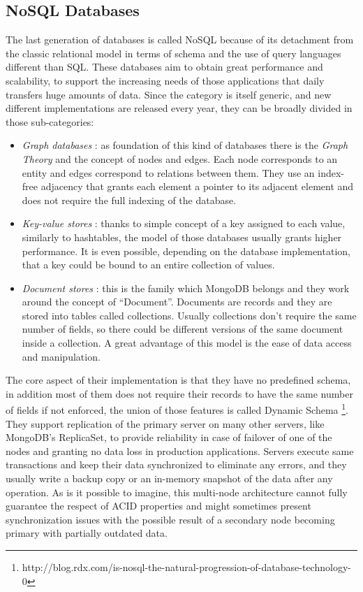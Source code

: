\subsection{NoSQL Databases}
The last generation of databases is called NoSQL because of its detachment from the classic relational model in terms of schema and the use of query languages different  than SQL.
These databases aim to obtain great performance and scalability, to support the increasing needs of those applications that daily transfers huge amounts of data.
Since the category is itself generic, and new different implementations are released every year, they can be broadly divided in those sub-categories:
\begin{itemize}
	\item \textit{Graph databases} : as foundation of this kind of databases there is the \textit{Graph Theory} and the concept of nodes and edges. Each node corresponds to an entity and edges correspond to relations between them. They use an index-free adjacency that grants each element a pointer to its adjacent element and does not require the full indexing of the database.
	\item \textit{Key-value stores} : thanks to simple concept of a key assigned to each value, similarly to hashtables, the model of those databases usually grants higher performance. It is even possible, depending on the database implementation, that a key could be bound to an entire collection of values.
	\item \textit{Document stores} : this is the family which MongoDB belongs and they work around the concept of  “Document”. Documents are records and they are stored into tables called collections. Usually collections don’t require the same number of fields, so there could be different versions of the same document inside a collection. A great advantage of this model is the ease of data access and manipulation.
\end{itemize}
The core aspect of their implementation is that they have no predefined schema, in addition most of them does not require their records to have the same number of fields if not enforced,  the union of those features is called Dynamic Schema \footnote{http://blog.rdx.com/is-nosql-the-natural-progression-of-database-technology-0}.
They support replication of the primary server on many other servers, like MongoDB’s ReplicaSet, to provide reliability in case of failover of one of the nodes and granting no data loss in production applications. Servers execute same transactions and keep their data synchronized to eliminate any errors, and they usually write a backup copy or an in-memory snapshot of the data after any operation. As is it possible to imagine, this multi-node architecture cannot fully guarantee the respect of ACID properties and might sometimes present synchronization issues with the possible result of a secondary node becoming primary with partially outdated data.
